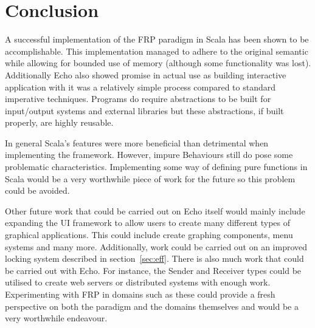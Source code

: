 \chapter{Conclusion}

A successful implementation of the FRP paradigm in Scala has been shown to be accomplishable. This implementation
managed to adhere to the original semantic while allowing for bounded use of memory (although some functionality was
lost). Additionally Echo also showed promise in actual use as building interactive application with it
was a relatively simple process compared to standard imperative techniques. Programs do require abstractions
to be built for input/output systems and external libraries but these abstractions, if built properly, are highly
reusable.

In general Scala's features were more beneficial than detrimental when implementing the framework. However,
impure Behaviours still do pose some problematic characteristics. Implementing some way of defining pure functions
in Scala would be a very worthwhile piece of work for the future so this problem could be avoided.

Other future work that could be carried out on Echo itself would mainly include expanding the
UI framework to allow users to create many different types of graphical applications. This could include
create graphing components, menu systems and many more. Additionally,
work could be carried out on an improved locking system described in section~\ref{sec:eff}. There is also much
work that could be carried out with Echo. For instance, the Sender and Receiver types could be utilised
to create web servers or distributed systems with enough work. Experimenting with FRP in domains such as
these could provide a fresh perspective on both the paradigm and the domains themselves and would be a very
worthwhile endeavour.